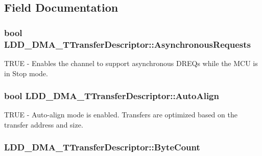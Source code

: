 \subsection{Field Documentation}
\hypertarget{struct_l_d_d___d_m_a___t_transfer_descriptor_aca370900692e662cc4828e68e2c31f0a}{
\subsubsection[{Asynchronous\-Requests}]{\setlength{\rightskip}{0pt plus 5cm}bool L\-D\-D\-\_\-\-D\-M\-A\-\_\-\-T\-Transfer\-Descriptor\-::\-Asynchronous\-Requests}}\label{struct_l_d_d___d_m_a___t_transfer_descriptor_aca370900692e662cc4828e68e2c31f0a}
T\-R\-U\-E -\/ Enables the channel to support asynchronous D\-R\-E\-Qs while the M\-C\-U is in Stop mode. \hypertarget{struct_l_d_d___d_m_a___t_transfer_descriptor_a7cf775aea2661c99d4fc11d6d18f862c}{
\subsubsection[{Auto\-Align}]{\setlength{\rightskip}{0pt plus 5cm}bool L\-D\-D\-\_\-\-D\-M\-A\-\_\-\-T\-Transfer\-Descriptor\-::\-Auto\-Align}}\label{struct_l_d_d___d_m_a___t_transfer_descriptor_a7cf775aea2661c99d4fc11d6d18f862c}
T\-R\-U\-E -\/ Auto-\/align mode is enabled. Transfers are optimized based on the transfer address and size. \hypertarget{struct_l_d_d___d_m_a___t_transfer_descriptor_aa02f90cb635b64ab6217e714bcdb1462}{
\subsubsection[{Byte\-Count}]{ L\-D\-D\-\_\-\-D\-M\-A\-\_\-\-T\-Transfer\-Descriptor\-::\-Byte\-Count}}\label{struct_l_d_d___d_m_a___t_transfer_descriptor_aa02f90cb635b64ab6217e714bcdb1462}
